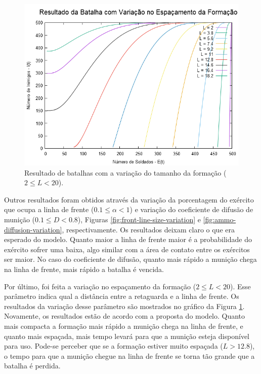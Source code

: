 \documentclass{article}
\begin{document}
\begin{figure}[ht]
	\centering
	\includegraphics[scale=0.35]{figs/battle_formation_size_variation.png}
	\caption{Resultado de batalhas com a variação do tamanho da formação ($2 \leq L < 20$).}
	\label{fig:formation-size-variation}
\end{figure}


Outros resultados foram obtidos através da variação da porcentagem do exército que ocupa a linha de frente ($0.1 \leq \alpha < 1$) e variação do coeficiente de difusão de munição ($0.1 \leq D < 0.8$), Figuras \ref{fig:front-line-size-variation} e \ref{fig:ammo-diffusion-variation}, respectivamente. Os resultados deixam claro o que era esperado do modelo. Quanto maior a linha de frente maior é a probabilidade do exército sofrer uma baixa, algo similar com a área de contato entre os exércitos ser maior. No caso do coeficiente de difusão, quanto mais rápido a munição chega na linha de frente, mais rápido a batalha é vencida.

Por último, foi feita a variação no espaçamento da formação ($2 \leq L < 20$). Esse parâmetro indica qual a distância entre a retaguarda e a linha de frente. Os resultados da variação desse parâmetro são mostrados no gráfico da Figura \ref{fig:formation-size-variation}. Novamente, os resultados estão de acordo com a proposta do modelo. Quanto mais compacta a formação mais rápido a munição chega na linha de frente, e quanto mais espaçada, mais tempo levará para que a munição esteja disponível para uso. Pode-se perceber que se a formação estiver muito espaçada ($L > 12.8$), o tempo para que a munição chegue na linha de frente se torna tão grande que a batalha é perdida.
\end{document}
